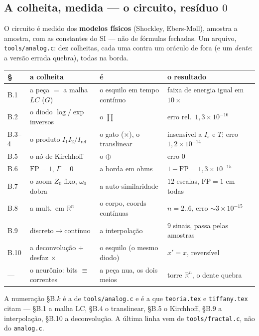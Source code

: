 \documentclass[11pt]{article}
\newcommand{\code}[1]{\texttt{\small #1}}
\theoremstyle{plain}
\theoremstyle{remark}
\begin{document}
\subsection{A colheita, medida --- o circuito, resíduo $0$}

O circuito é medido dos \textbf{modelos físicos} (Shockley, Ebers-Moll), amostra a amostra, com as
constantes do SI --- não de fórmulas fechadas. Um arquivo, \code{tools/analog.c}: dez colheitas, cada
uma contra um oráculo de fora (e um \emph{dente}: a versão errada quebra), todas na borda.

\begin{center}\small
\begin{tabular}{@{}llll@{}}
\toprule
§ & a colheita & é & o resultado \\
\midrule
B.1 & a peça $=$ a malha $LC$ ($G$) & o esquilo em tempo contínuo & faixa de energia igual em $10\times$ \\
B.2 & o diodo $\log/\exp$ inversos & o $\prod$ & erro rel.\ $1{,}3\times10^{-16}$ \\
B.3--4 & o produto $I_1I_2/I_{\text{ref}}$ & o gato ($\times$), o translinear & insensível a $I_s$ e $T$; erro $1{,}2\times10^{-14}$ \\
B.5 & o nó de Kirchhoff & o $\oplus$ & erro $0$ \\
B.6 & $\mathrm{FP}=1$, $\Gamma=0$ & a borda em ohms & $1-\mathrm{FP}=1{,}3\times10^{-15}$ \\
B.7 & o zoom $Z_0$ fixo, $\omega_0$ dobra & a auto-similaridade & $12$ escalas, $\mathrm{FP}=1$ em todas \\
B.8 & a mult.\ em $\mathbb{R}^n$ & o corpo, coords contínuas & $n=2..6$, erro $\sim3\times10^{-15}$ \\
B.9 & discreto$\to$contínuo & a interpolação & $9$ sinais, passa pelas amostras \\
B.10 & a deconvolução $\div$ desfaz $\times$ & o esquilo (o mesmo diodo) & $x'=x$, reversível \\
--- & o neurônio: bits $\equiv$ correntes & a peça nua, os dois meios & torre $\mathbb R^n$, o dente quebra \\
\bottomrule
\end{tabular}
\end{center}

\noindent A numeração §B.$k$ é a de \code{tools/analog.c} e é a que \texttt{teoria.tex} e
\texttt{tiffany.tex} citam --- §B.1 a malha LC, §B.4 o translinear, §B.5 o Kirchhoff, §B.9 a
interpolação, §B.10 a deconvolução. A última linha vem de \code{tools/fractal.c}, não do
\code{analog.c}.
\end{document}
